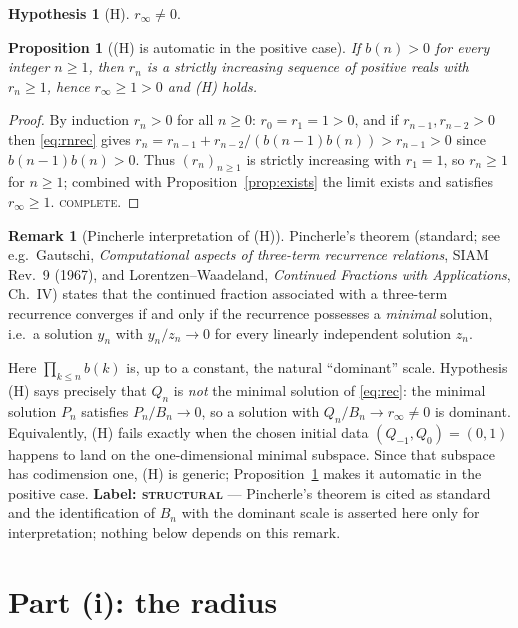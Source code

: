 \documentclass[11pt]{article}
\newtheorem{proposition}[theorem]{Proposition}
\theoremstyle{definition}
\newtheorem{remark}[theorem]{Remark}
\newtheorem{hypothesis}[theorem]{Hypothesis}
\newcommand{\rinf}{r_\infty}
\begin{document}
\begin{hypothesis}[H]\label{hyp:H}
$\rinf\neq0$.
\end{hypothesis}

\begin{proposition}[(H) is automatic in the positive case]\label{prop:positive}
If $b(n)>0$ for every integer $n\ge1$, then $r_n$ is a strictly increasing
sequence of positive reals with $r_n\ge1$, hence $\rinf\ge1>0$ and
\textup{(H)} holds.
\end{proposition}

\begin{proof}
By induction $r_n>0$ for all $n\ge0$: $r_0=r_1=1>0$, and if
$r_{n-1},r_{n-2}>0$ then \eqref{eq:rnrec} gives
$r_n=r_{n-1}+r_{n-2}/(b(n-1)b(n))>r_{n-1}>0$ since $b(n-1)b(n)>0$.
Thus $(r_n)_{n\ge1}$ is strictly increasing with $r_1=1$, so $r_n\ge1$ for
$n\ge1$; combined with Proposition~\ref{prop:exists} the limit exists and
satisfies $\rinf\ge1$. \textsc{complete.}
\end{proof}

\begin{remark}[Pincherle interpretation of (H)]\label{rem:pincherle}
Pincherle's theorem (standard; see e.g.\ Gautschi, \emph{Computational aspects
of three-term recurrence relations}, SIAM Rev.\ 9 (1967), and Lorentzen--Waadeland,
\emph{Continued Fractions with Applications}, Ch.~IV) states that the continued
fraction associated with a three-term recurrence converges if and only if the
recurrence possesses a \emph{minimal} solution, i.e.\ a solution $y_n$ with
$y_n/z_n\to0$ for every linearly independent solution $z_n$.

Here $\prod_{k\le n}b(k)$ is, up to a constant, the natural ``dominant'' scale.
Hypothesis (H) says precisely that $Q_n$ is \emph{not} the minimal solution of
\eqref{eq:rec}: the minimal solution $P_n$ satisfies $P_n/B_n\to0$, so a
solution with $Q_n/B_n\to\rinf\neq0$ is dominant. Equivalently, (H) fails exactly
when the chosen initial data $(Q_{-1},Q_0)=(0,1)$ happens to land on the
one-dimensional minimal subspace. Since that subspace has codimension one, (H) is
generic; Proposition~\ref{prop:positive} makes it automatic in the positive case.
\textbf{Label: \textsc{structural}} --- Pincherle's theorem is cited as standard
and the identification of $B_n$ with the dominant scale is asserted here only for
interpretation; nothing below depends on this remark.
\end{remark}

\section{Part (i): the radius}
\end{document}
